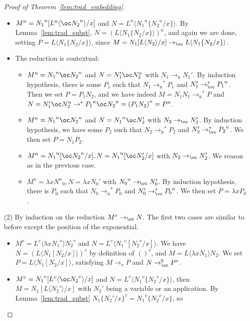 \documentclass[10pt,a4paper]{article}
\newcommand{\<}{\langle}
\renewcommand{\>}{\rangle}
\newcommand{\ton}{\ensuremath{\to_{\text{n}}}}
\newcommand{\tov}{\ensuremath{\to_{\text{v}}}}
\newcommand{\todbf}{\to_{\oc}} %
\newcommand{\tradv}[1]{\ensuremath{{#1}^v}}
\newcommand{\tradn}[1]{\ensuremath{{#1}^n}}
\begin{document}
\begin{proof}[Proof of Theorem~\ref{lem:trad_embedding}]
\begin{itemize}
		\item $\tradn M=\tradn{N_1}[\tradn L\<\oc \tradn{N_2}\>/x]$ and
			$N=\tradn L\<\tradn{N_1}\{\tradn{N_2}/x\}\>$. By
			Lemma~\ref{lem:trad_subst},
			$N=\tradn{(L\<N_1\{N_2/x\}\>)}$, and again we are done,
			setting $P=L\<N_1\{N_2/x\}\>$, since $M=N_1[L\< N_2\>/x]\todbf L\<N_1\{N_2/x\}\>$.
		\item The reduction is contextual:
			\begin{itemize}
				\item $\tradn M=\tradn{N_1}\oc\tradn{N_2}$ and
					$N=N_1'\oc\tradn N_2$ with $N_1\ton
					N_1'$. By induction hypothesis, there is
					some $P_1$ such that $N_1\ton^* P_1$ and
					$N_1'\todbf^* \tradn{P_1}$. Then we set
					$P=P_1N_2$, and we have indeed
					$M=N_1N_1\ton^*P$ and $N=N_1'\oc\tradn
					N_2\to^*
					\tradn{P_1}\oc\tradn{N_2}=\tradn{(P_1N_2)}=\tradn P$.
				\item $\tradn M=\tradn{N_1}\oc\tradn{N_2}$ and
					$N=\tradn{N_1}\oc N_2'$ with $N_2\todbf
					N_2'$. By induction hypothesis, we have
					some $P_2$ such that $N_2\ton^*P_2$ and
					$N_2'\todbf^*\tradn{P_2}$. We then set
					$P=N_1P_2$.
				\item $\tradn
					M=\tradn{N_1}[\oc\tradn{N_2}/x],N=\tradn{N_1}[\oc
					N_2'/x]$ with $N_2\todbf N_2'$. We reason
					as in the previous case.
				\item $\tradn M=\lambda x\tradn N_0, N=\lambda x
					N_0'$ with $\tradn{N_0}\todbf N_0'$. By induction
					hypothesis, there is $P_0$ such that
					$N_0\ton^* P_0$ and $N_0'\todbf^*
					\tradn{P_0}$. We then set $P=\lambda x
					P_0$.
			\end{itemize}
	\end{itemize}
	(2) By induction on the reduction $\tradv M\todbf N$. The first two
	cases are similar to before except the position of the exponential.
	\begin{itemize}
		\item $\tradv M=\tradv L\<\lambda x \tradv{N_1}\>\tradv{N_2}$ and
			$N=\tradv L\<\tradv{N_1}[\tradv{N_2}/x]\>$. We have
			$N=\tradv{(L\<N_1[N_2/x]\>)}$ by definition of
			$\tradv{()}$, and $M=L\<\lambda xN_1\>N_2$. We set
			$P=L\<N_1[N_2/x]\>$, satisfying $M\tov P$ and $N\todbf^0
			\tradv P$.
		\item $\tradv M=\tradv{N_1}[\tradv L\<\oc \tradv{N_2}\>/x]$ and
			$N=\tradv L\<\tradv{N_1}\{\tradv{N_2}/x\}\>$, then
			$M=N_1[L\<N_2'\>/x]$ with $N_2'$ being a
			variable or an application. By
			Lemma~\ref{lem:trad_subst}
			$\tradv{N_1\{N_2'/x\}}=\tradv{N_1}\{\tradv{N_2}/x\}$, so

\end{itemize}
\end{proof}
\end{document}

